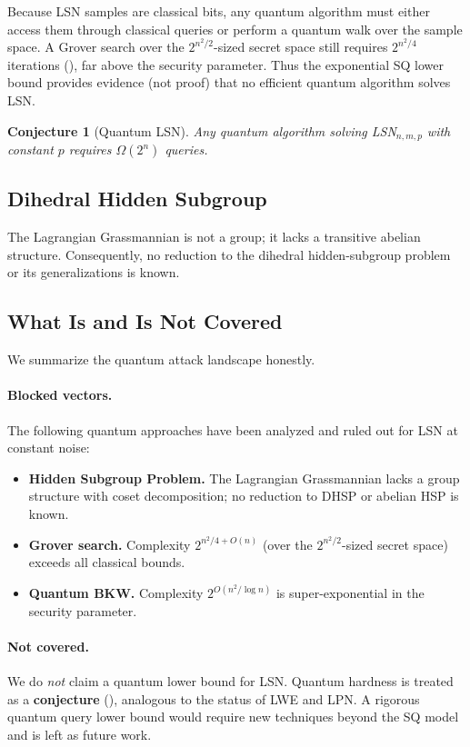 \documentclass[11pt,a4paper]{article}
\theoremstyle{plain}
\newtheorem{conjecture}[theorem]{Conjecture}
\theoremstyle{definition}
\begin{document}
Because LSN samples are classical bits, any quantum algorithm must either access them through classical queries or perform a quantum walk over the sample space. A Grover search over the $2^{n^2/2}$-sized secret space still requires $2^{n^2/4}$ iterations (), far above the security parameter. Thus the exponential SQ lower bound provides evidence (not proof) that no efficient quantum algorithm solves LSN.

\begin{conjecture}[Quantum LSN]
\label{conj:quantum}
Any quantum algorithm solving LSN$_{n,m,p}$ with constant $p$ requires $\Omega(2^n)$ queries.
\end{conjecture}

\subsection{Dihedral Hidden Subgroup}
\label{subsec:dhsp}

The Lagrangian Grassmannian is not a group; it lacks a transitive abelian structure. Consequently, no reduction to the dihedral hidden-subgroup problem or its generalizations is known.

\subsection{What Is and Is Not Covered}
\label{subsec:quantum-covered}

We summarize the quantum attack landscape honestly.

\paragraph{Blocked vectors.} The following quantum approaches have been analyzed and ruled out for LSN at constant noise:
\begin{itemize}
\item \textbf{Hidden Subgroup Problem.} The Lagrangian Grassmannian lacks a group structure with coset decomposition; no reduction to DHSP or abelian HSP is known.
\item \textbf{Grover search.} Complexity $2^{n^2/4 + O(n)}$ (over the $2^{n^2/2}$-sized secret space) exceeds all classical bounds.
\item \textbf{Quantum BKW.} Complexity $2^{O(n^2 / \log n)}$ is super-exponential in the security parameter.
\end{itemize}

\paragraph{Not covered.} We do \emph{not} claim a quantum lower bound for LSN. Quantum hardness is treated as a \textbf{conjecture} (), analogous to the status of LWE and LPN. A rigorous quantum query lower bound would require new techniques beyond the SQ model and is left as future work.
\end{document}
